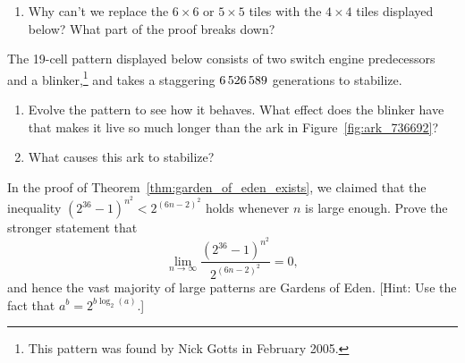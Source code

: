 \begin{multicols}{2}
\begin{problemstar}
\begin{enumerate}[label=\bf\color{ocre}(\alph*)]
			\begin{center}
			\end{center}
			
			\item Why can't we replace the $6 \times 6$ or $5 \times 5$ tiles with the $4 \times 4$ tiles displayed below? What part of the proof breaks down?
			
			\begin{center}
			\end{center}
		\end{enumerate}
	\end{problemstar}
	
	
	\mfilbreak
	
	
	\begin{problemstar}\label{exer:ark} 
		The 19-cell pattern displayed below consists of two switch engine predecessors and a blinker,\footnote{This pattern was found by Nick Gotts in February 2005.} and takes a staggering $6{\,}526{\,}589$ generations to stabilize.
		
		\begin{center}
		\end{center}
		
		\begin{enumerate}[label=\bf\color{ocre}(\alph*)]
			\item Evolve the pattern to see how it behaves. What effect does the blinker have that makes it live so much longer than the ark in Figure~\ref{fig:ark_736692}?
			
			\item What causes this ark to stabilize?
			
		\end{enumerate}
	\end{problemstar}
	
	
	\mfilbreak
	
	
	\begin{problem}\label{exer:goe_theorem_limit} 
		In the proof of Theorem~\ref{thm:garden_of_eden_exists}, we claimed that the inequality $(2^{36}-1)^{n^2} < 2^{(6n-2)^2}$ holds whenever $n$ is large enough. Prove the stronger statement that
		\[
		\lim_{n\rightarrow\infty}\frac{(2^{36}-1)^{n^2}}{2^{(6n-2)^2}} = 0,
		\]
		and hence the vast majority of large patterns are Gardens of Eden. [Hint: Use the fact that $a^b = 2^{b\log_2(a)}$.]
	\end{problem}
	

\end{multicols}
